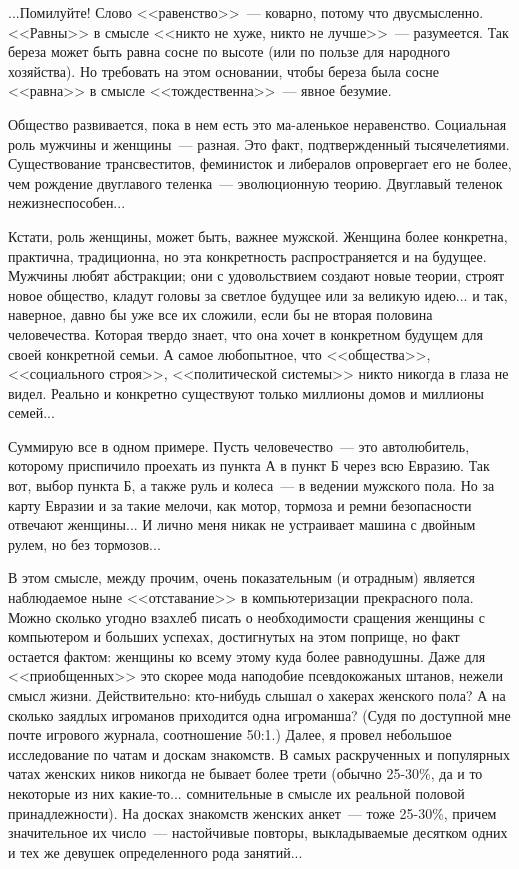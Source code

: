 \documentclass{scrbook}
\newcommand{\flqq}{<<}
\newcommand{\frqq}{>>}
\newcommand{\mdash}{~--- }
\begin{document}
...Помилуйте! Слово {\flqq}равенство{\frqq}{\mdash}коварно, потому что двусмысленно. {\flqq}Равны{\frqq} в смысле {\flqq}никто не хуже, никто не лучше{\frqq}{\mdash}разумеется. Так береза может быть равна сосне по высоте (или по пользе для народного хозяйства). Но требовать на этом основании, чтобы береза была сосне {\flqq}равна{\frqq} в смысле {\flqq}тождественна{\frqq}{\mdash}явное безумие.

Общество развивается, пока в нем есть это ма-аленькое неравенство. Социальная роль мужчины и женщины{\mdash}разная. Это факт, подтвержденный тысячелетиями. Существование трансвеститов, феминисток и либералов опровергает его не более, чем рождение двуглавого теленка{\mdash}эволюционную теорию. Двуглавый теленок нежизнеспособен...

Кстати, роль женщины, может быть, важнее мужской. Женщина более конкретна, практична, традиционна, но эта конкретность распространяется и на будущее. Мужчины любят абстракции; они с удовольствием создают новые теории, строят новое общество, кладут головы за светлое будущее или за великую идею... и так, наверное, давно бы уже все их сложили, если бы не вторая половина человечества. Которая твердо знает, что она хочет в конкретном будущем для своей конкретной семьи. А самое любопытное, что {\flqq}общества{\frqq}, {\flqq}социального строя{\frqq}, {\flqq}политической системы{\frqq} никто никогда в глаза не видел. Реально и конкретно существуют только миллионы домов и миллионы семей...

Суммирую все в одном примере. Пусть человечество{\mdash}это автолюбитель, которому приспичило проехать из пункта А в пункт Б через всю Евразию. Так вот, выбор пункта Б, а также руль и колеса{\mdash}в ведении мужского пола. Но за карту Евразии и за такие мелочи, как мотор, тормоза и ремни безопасности отвечают женщины... И лично меня никак не устраивает машина с двойным рулем, но без тормозов...

В этом смысле, между прочим, очень показательным (и отрадным) является наблюдаемое ныне {\flqq}отставание{\frqq} в компьютеризации прекрасного пола. Можно сколько угодно взахлеб писать о необходимости сращения женщины с компьютером и больших успехах, достигнутых на этом поприще, но факт остается фактом: женщины ко всему этому куда более равнодушны. Даже для {\flqq}приобщенных{\frqq} это скорее мода наподобие псевдокожаных штанов, нежели смысл жизни. Действительно: кто-нибудь слышал о хакерах женского пола? А на сколько заядлых игроманов приходится одна игроманша? (Судя по доступной мне почте игрового журнала, соотношение 50:1.) Далее, я провел небольшое исследование по чатам и доскам знакомств. В самых раскрученных и популярных чатах женских ников никогда не бывает более трети (обычно 25-30\%, да и то некоторые из них какие-то... сомнительные в смысле их реальной половой принадлежности). На досках знакомств женских анкет{\mdash}тоже 25-30\%, причем значительное их число{\mdash}настойчивые повторы, выкладываемые десятком одних и тех же девушек определенного рода занятий...
\end{document}
